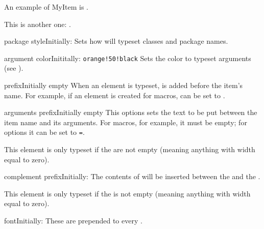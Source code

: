 \documentclass[11pt, outputdir = ./out]{article}
\begin{document}
\begin{example}{}
    An example of MyItem is .\par
    This is another one: .
\end{example}

\begin{Optiondef}{package style}{}{Initially: }
    Sets how  will typeset classes and package names.
\end{Optiondef}

\begin{Optiondef}{argument color}{}{Inititally: \texttt{orange!50!black}}
    Sets the color to typeset arguments (see ).
\end{Optiondef}

\begin{Optiondef}{prefix}{}{Initially empty}
    When an element is typeset,  is added before the item's name. For example, if an element is created for macros,  can be set to .
\end{Optiondef}

\begin{Optiondef}{arguments prefix}{}{Initially empty}
    This options sets the text to be put between the item name and its arguments. For macros, for example, it must be empty; for options it can be set to \texttt{=}.

    This element is only typeset if the  are not empty (meaning anything with width equal to zero).
\end{Optiondef}

\begin{Optiondef}{complement prefix}{}{Initially: }
    The contents of  will be inserted between the  and the .

    This element is only typeset if the  is not empty (meaning anything with width equal to zero).
\end{Optiondef}

\begin{Optiondef}{font}{}{Initially: }
    These  are prepended to every .
\end{Optiondef}
\end{document}

